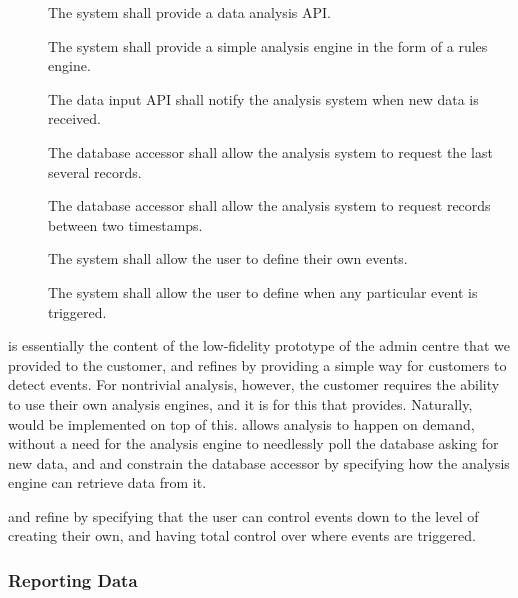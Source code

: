\begin{description}
 \item[] The system shall provide a data analysis API.

 \item[] The system shall provide a simple analysis engine
 in the form of a rules engine.

 \item[] The data input API shall notify the analysis
 system when new data is received.

 \item[] The database accessor shall allow the analysis
 system to request the last several records.

 \item[] The database accessor shall allow the analysis
 system to request records between two timestamps.

 \item[] The system shall allow the user to define their
 own events.

 \item[] The system shall allow the user to define when any
 particular event is triggered.
\end{description}

 is essentially the content of the low-fidelity prototype of
the admin centre that we provided to the customer, and refines 
by providing a simple way for customers to detect events. For
nontrivial analysis, however, the customer requires the ability to use
their own analysis engines, and it is for this that 
provides. Naturally,  would be implemented on top of
this.  allows analysis to happen on demand, without a need
for the analysis engine to needlessly poll the database asking for new
data, and  and  constrain the database accessor by
specifying how the analysis engine can retrieve data from it.

 and  refine  by specifying that the user can
control events down to the level of creating their own, and having
total control over where events are triggered.

\subsubsection{Reporting Data}
\label{sec:requirements-functional-feedback}

